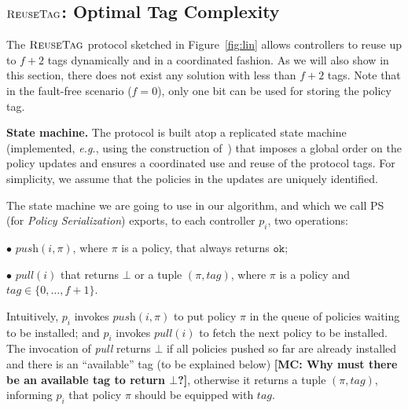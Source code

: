 \documentclass[11pt,pdftex,letter]{article}
\newcommand{\DPO}{\textsc{ReuseTag}}
\newcommand{\PS}{\textsc{PS}}
\newcommand{\eg}{{\it e.g.}}
\newcommand{\mcnote}[1]{\textcolor{heraldBlue}{\small \bf [MC: #1]}}
\newcommand{\ssnote}[1]{\textcolor{heraldBlue}{\small \bf [SS: #1]}}
\newcommand{\mcnote}[1]{}
\newcommand{\ssnote}[1]{}
\begin{document}
\subsection{$\DPO$: Optimal Tag Complexity}

The $\DPO$ protocol sketched in Figure~\ref{fig:lin}
allows controllers to reuse up to $f+2$ tags dynamically and in a coordinated fashion.
As we will also show in this section, there does not exist any
solution with less than $f+2$ tags.
Note that in the fault-free scenario ($f=0$), only one bit can be used
for storing the policy tag.

\vspace{1mm}
\noindent
\textbf{State machine.}
The protocol is built atop a replicated state machine
(implemented, \eg, using the
construction of~\cite{Her91}) that imposes a global
order on the policy updates and ensures a coordinated use and reuse of
the protocol tags.
For simplicity, we assume that the policies in the updates are uniquely identified.

The state machine we are going to use in our algorithm, and which we
call {\PS} (for \emph{Policy Serialization})
exports, to each controller $p_i$, two operations:

\vspace{1.5mm}
\noindent $\bullet$
$\textit{push}(i,\pi)$, where $\pi$ is a policy, that always returns
  $\texttt{ok}$; %

\vspace{0.5mm}
\noindent $\bullet$ $\textit{pull}(i)$ that returns $\bot$  or a tuple
  $(\pi,\textit{tag})$,
  where $\pi$ is a policy and
  $\textit{tag}\in\{0,\ldots, f+1\}$.
%
\vspace{1.5mm}

Intuitively, $p_i$ invokes $\textit{push}(i,\pi)$ to put policy $\pi$
in the queue of policies waiting to be installed;
and $p_i$ invokes $\textit{pull}(i)$ to fetch the next policy
to be installed. The invocation of \textit{pull} returns $\bot$ if all policies pushed so
far are already installed and there is an ``available'' tag (to be
explained below) \mcnote{Why must there be an available tag to return $\bot$?}, otherwise it returns a tuple
$(\pi,\textit{tag})$, informing $p_i$ that policy $\pi$ should be
equipped with $\textit{tag}$.
\end{document}
